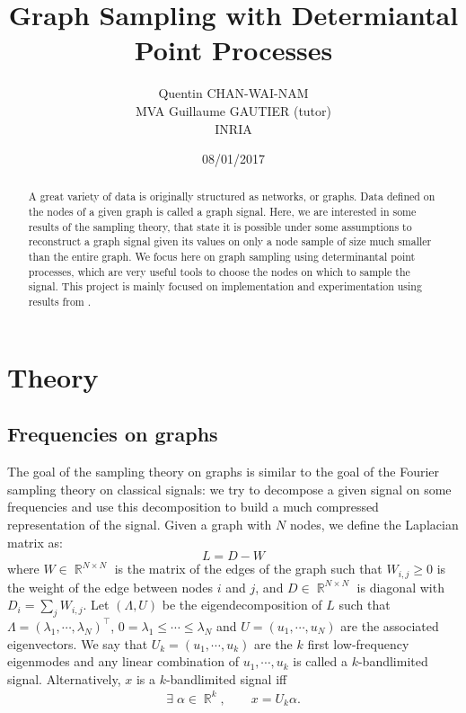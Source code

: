 \documentclass{article}
\title{Graph Sampling with Determiantal Point Processes}
\author{
	Quentin CHAN-WAI-NAM \\ MVA
	\And
	Guillaume GAUTIER (tutor) \\ INRIA
}
\date{08/01/2017}
\DeclareMathOperator{\R}{\mathbb{R}}
\begin{document}
\maketitle

\begin{abstract}
	A great variety of data is originally structured as networks, or graphs. Data
	defined on the nodes of a given graph is called a graph signal. Here, we are
	interested in some results of the sampling theory, that state it is possible
	under some assumptions to reconstruct a graph signal given its values on only
	a node sample of size much smaller than the entire graph. We focus here on
	graph sampling using determinantal point processes, which are very useful
	tools to choose the nodes on which to sample the signal. This project is
	mainly focused on implementation and experimentation using results from \cite{tremblay2017}.
\end{abstract}


\section{Theory}


\subsection{Frequencies on graphs}


The goal of the sampling theory on graphs \cite{shuman2012} is similar to the goal of the Fourier sampling theory on classical signals: we try to decompose a given signal on some frequencies and use this decomposition to build a much compressed representation of the signal. Given a graph with $N$ nodes, we define the Laplacian matrix as:
\[ L = D - W \]
where $W \in \R^{N \times N}$ is the matrix of the edges of the graph such that $W_{i, j} \geq 0$ is the weight of the edge between nodes $i$ and $j$, and $D \in \R^{N \times N}$ is diagonal with $D_{i} = \sum_j W_{i, j}$. Let $(\Lambda, U)$ be the eigendecomposition of $L$ such that $\Lambda = (\lambda_1, \cdots, \lambda_N)^\top$, $0 = \lambda_1 \leq \cdots \leq \lambda_N$ and $U = (u_1, \cdots, u_N)$ are the associated eigenvectors. We say that $U_k = (u_1, \cdots, u_k)$ are the $k$ first low-frequency eigenmodes and any linear combination of $u_1, \cdots, u_k$ is called a $k$-bandlimited signal. Alternatively, $x$ is a $k$-bandlimited signal iff
\begin{align} \exists \; \alpha \in \R^k, \qquad x = U_k \alpha. \label{eq:bandlimited}\end{align}
\end{document}
